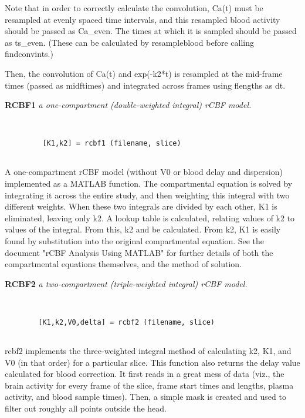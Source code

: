   Note that in order to correctly calculate the convolution, Ca(t) must
  be resampled at evenly spaced time intervals, and this resampled blood
  activity should be passed as Ca\_even.  The times at which it is
  sampled should be passed as ts\_even.  (These can be calculated by
  resampleblood before calling findconvints.)
 
  Then, the convolution of Ca(t) and exp(-k2*t) is resampled at the
  mid-frame times (passed as midftimes) and integrated across frames
  using flengths as dt.
\newpage


{\large\bf RCBF1} {\em a one-compartment (double-weighted integral) rCBF model.}
\begin{verbatim}


         [K1,k2] = rcbf1 (filename, slice)


\end{verbatim}

  A one-compartment rCBF model (without V0 or blood delay and 
  dispersion) implemented as a MATLAB function.  The
  compartmental equation is solved by integrating it across
  the entire study, and then weighting this integral with two
  different weights.  When these two integrals are divided by
  each other, K1 is eliminated, leaving only k2.  A lookup
  table is calculated, relating values of k2 to values of the
  integral.  From this, k2 and be calculated.  From k2, K1 is
  easily found by substitution into the original compartmental
  equation.  See the document "rCBF Analysis Using MATLAB" for
  further details of both the compartmental equations
  themselves, and the method of solution.
\newpage


{\large\bf RCBF2} {\em a two-compartment (triple-weighted integral) rCBF model.}
\begin{verbatim}


        [K1,k2,V0,delta] = rcbf2 (filename, slice)


\end{verbatim}

  rcbf2 implements the three-weighted integral method of calculating
  k2, K1, and V0 (in that order) for a particular slice.  This
  function also returns the delay value calculated for blood
  correction.  It first reads in a great mess of data (viz., the brain
  activity for every frame of the slice, frame start times and
  lengths, plasma activity, and blood sample times).  Then, a simple
  mask is created and used to filter out roughly all points outside
  the head.
  
